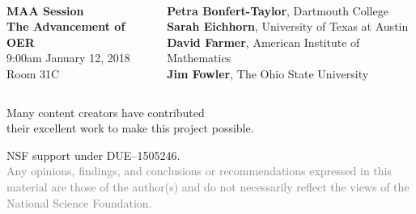\documentclass{chalkboard}
\begin{document}
\whitebackground

\clearbackgroundpicture
\begin{frame}[nofills]
  \vspace{5ex}

  \large
   \\[1ex]

  \vfill
  
  \begin{columns}
    \begin{column}{0.39\textwidth}
      \color{osugray}
      \large
      \textbf{MAA Session} \\
      \textbf{The Advancement of OER} \\
      9:00am January 12, 2018 \\
      Room 31C %
    \end{column}

    \begin{column}{0.6\textwidth}
      \large
      \textbf{Petra Bonfert-Taylor}, Dartmouth College \\
      \textbf{Sarah Eichhorn}, University of Texas at Austin  \\
      \textbf{David Farmer}, American Institute of Mathematics  \\
      \textbf{Jim Fowler}, The Ohio State University  \\
    \end{column}

\end{columns}
  
\end{frame}

\begin{frame}
  \huge

  Many content creators have contributed \\
  \quad their excellent work to make this project possible.

  \vfill

  NSF support under DUE--1505246. \\

  \textcolor{gray}{Any opinions, findings, and conclusions or
    recommendations expressed in this material are those of the
    author(s) and do not necessarily reflect the views of the National
    Science Foundation.}

\end{frame}
\end{document}
